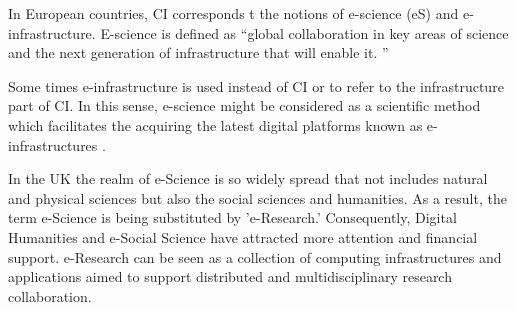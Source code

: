 \documentclass[acmsmall,authordraft]{acmart}
\begin{document}
In European countries, CI corresponds t the notions of e-science (eS) and e-infrastructure. E-science is defined as ``global collaboration in key areas of science and the next generation of infrastructure that will enable it. \citep{hey2002uk}''
 
 Some times e-infrastructure is used instead of CI or to refer to the infrastructure part of CI.  In this sense, e-science might be considered as a scientific method which facilitates the acquiring the latest digital platforms known as e-infrastructures \citep[p.~2,3]{pacheco2018digital}.
 
 In the UK the realm of e-Science is so widely spread that not includes natural and physical sciences but also the social sciences and humanities. As a result, the term e-Science is being substituted by 'e-Research.' Consequently, Digital Humanities and e-Social Science have attracted more attention and financial support. e-Research can be seen as a collection of computing infrastructures and applications aimed to support distributed and multidisciplinary research collaboration. \citep{jirotka2013supporting} 
\end{document}
